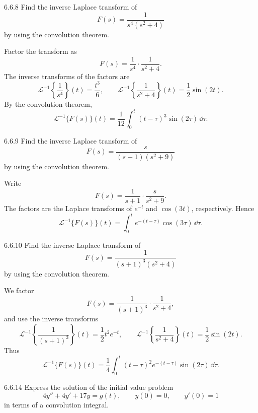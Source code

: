 \documentclass[11pt,oneside]{article}
\begin{document}
\begin{problem}{6.6.8}
Find the inverse Laplace transform of
\[
    F(s)=\frac{1}{s^4(s^2+4)}
\]
by using the convolution theorem.
\end{problem}

\begin{solution}
Factor the transform as
\[
    F(s)=\frac{1}{s^4}\cdot\frac{1}{s^2+4}.
\]
The inverse transforms of the factors are
\[
    \mathcal{L}^{-1}\left\{\frac{1}{s^4}\right\}(t)=\frac{t^3}{6},
    \qquad
    \mathcal{L}^{-1}\left\{\frac{1}{s^2+4}\right\}(t)=\frac{1}{2}\sin(2t).
\]
By the convolution theorem,
\[
    \boxed{
       \mathcal{L}^{-1}\{F(s)\}(t)
       =\frac{1}{12}\int_0^t(t-\tau)^3\sin(2\tau)\,\dd\tau
    }.
\]
\end{solution}

\begin{problem}{6.6.9}
Find the inverse Laplace transform of
\[
    F(s)=\frac{s}{(s+1)(s^2+9)}
\]
by using the convolution theorem.
\end{problem}

\begin{solution}
Write
\[
    F(s)=\frac{1}{s+1}\cdot\frac{s}{s^2+9}.
\]
The factors are the Laplace transforms of $e^{-t}$ and $\cos(3t)$, respectively. Hence
\[
    \boxed{
        \mathcal{L}^{-1}\{F(s)\}(t)
        =\int_0^t e^{-(t-\tau)}\cos(3\tau)\,\dd\tau
    }.
\]
\end{solution}

\begin{problem}{6.6.10}
Find the inverse Laplace transform of
\[
    F(s)=\frac{1}{(s+1)^3(s^2+4)}
\]
by using the convolution theorem.
\end{problem}

\begin{solution}
We factor
\[
    F(s)=\frac{1}{(s+1)^3}\cdot\frac{1}{s^2+4},
\]
and use the inverse transforms
\[
    \mathcal{L}^{-1}\left\{\frac{1}{(s+1)^3}\right\}(t)
        =\frac{1}{2}t^2e^{-t},
    \qquad
    \mathcal{L}^{-1}\left\{\frac{1}{s^2+4}\right\}(t)
        =\frac{1}{2}\sin(2t).
\]
Thus
\[
    \boxed{
        \mathcal{L}^{-1}\{F(s)\}(t)
        =\frac{1}{4}\int_0^t(t-\tau)^2e^{-(t-\tau)}\sin(2\tau)\,\dd\tau
    }.
\]
\end{solution}

\begin{problem}{6.6.14}
Express the solution of the initial value problem
\[
    4y''+4y'+17y=g(t),
    \qquad y(0)=0, \qquad y'(0)=1
\]
in terms of a convolution integral.
\end{problem}
\end{document}
